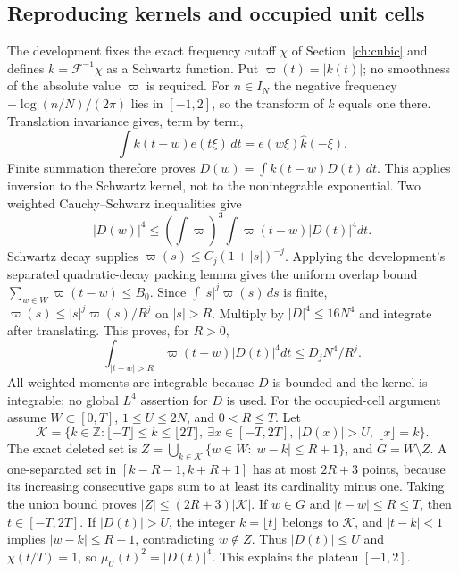 \documentclass[11pt,a4paper,oneside]{article}
\theoremstyle{definition}
\newcommand{\Z}{\mathbb Z}
\numberwithin{equation}{section}
\begin{document}
\subsection{Reproducing kernels and occupied unit cells}
The development fixes the exact frequency cutoff $\chi$ of Section~\ref{ch:cubic}
and defines $k=\mathcal F^{-1}\chi$ as a Schwartz function. Put $\varpi(t)=|k(t)|$;
no smoothness of the absolute value $\varpi$ is required.
For $n\in I_N$ the negative frequency
$-\log(n/N)/(2\pi)$ lies in $[-1,2]$, so the transform of $k$ equals one
there. Translation invariance gives, term by term,
\[
 \int k(t-w)e(t\xi)\,dt=e(w\xi)\widehat k(-\xi).
\]
Finite summation therefore proves $D(w)=\int k(t-w)D(t)\,dt$.
This applies inversion to the Schwartz kernel, not to the nonintegrable
exponential. Two weighted Cauchy--Schwarz inequalities give
\[
 |D(w)|^4\le\left(\int \varpi\right)^3\int \varpi(t-w)|D(t)|^4dt.
\]
Schwartz decay supplies $\varpi(s)\le C_j(1+|s|)^{-j}$. Applying the development's
separated quadratic-decay packing lemma gives the uniform overlap bound
$\sum_{w\in W}\varpi(t-w)\le B_0$. Since $\int|s|^j\varpi(s)\,ds$ is finite,
$\varpi(s)\le |s|^j\varpi(s)/R^j$ on $|s|>R$. Multiply by
$|D|^4\le16N^4$ and integrate after translating. This proves, for $R>0$,
\[
 \int_{|t-w|>R}\varpi(t-w)|D(t)|^4dt\le D_jN^4/R^j.
\]
All weighted moments are integrable because $D$ is bounded and the kernel
is integrable; no global $L^4$ assertion for $D$ is used.
For the occupied-cell argument assume $W\subset[0,T]$, $1\le U\le2N$, and $0<R\le T$. Let
\[
 \mathcal K=\{k\in\Z:\lfloor-T\rfloor\le k\le\lfloor2T\rfloor,
       \ \exists x\in[-T,2T],\ |D(x)|>U,\ \lfloor x\rfloor=k\}.
\]
The exact deleted set is
$Z=\bigcup_{k\in\mathcal K}\{w\in W:|w-k|\le R+1\}$, and $G=W\setminus Z$.
A one-separated set in $[k-R-1,k+R+1]$ has at most $2R+3$ points, because its increasing consecutive gaps sum to at least its cardinality minus one.
Taking the union bound proves $|Z|\le(2R+3)|\mathcal K|$.
If $w\in G$ and $|t-w|\le R\le T$, then $t\in[-T,2T]$.
If $|D(t)|>U$, the integer $k=\lfloor t\rfloor$ belongs to $\mathcal K$,
and $|t-k|<1$ implies $|w-k|\le R+1$, contradicting $w\notin Z$.
Thus $|D(t)|\le U$ and $\chi(t/T)=1$, so
$\mu_U(t)^2=|D(t)|^4$. This explains the plateau $[-1,2]$.
\end{document}
